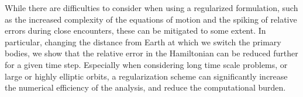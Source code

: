 \documentclass[11pt,twoside,letterpaper]{article}
\begin{document}
  While there are difficulties to consider when using a regularized
  formulation, such as the increased complexity of the equations of
  motion and the spiking of relative errors during close encounters,
  these can be mitigated to some extent. In particular, changing the
  distance from Earth at which we switch the primary bodies, we show
  that the relative error in the Hamiltonian can be reduced further
  for a given time step. Especially when considering long time scale
  problems, or large or highly elliptic orbits, a regularization
  scheme can significantly increase the numerical efficiency of the
  analysis, and reduce the computational burden. 

  {}
  
\end{document}
